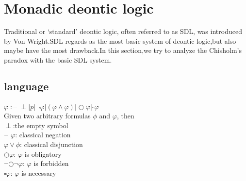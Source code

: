 \documentclass{article}
\begin{document}
\section{Monadic deontic logic}
Traditional or ‘standard’ deontic logic, often referred to as SDL, was introduced by Von Wright\cite{4}.SDL regards as the most basic system of deontic logic,but also maybe have the most drawback.In this section,we try to analyze the Chisholm’s paradox with the basic SDL system.
\subsection{language}
$\varphi :=\perp | p |\neg \varphi |(\varphi \wedge \varphi)|\bigcirc\varphi|\square\varphi $\\
Given two arbitrary formulas $\phi$  and $\varphi$, then\\
$\perp$:the empty symbol\\
$\neg$ $\varphi$: classical negation\\
$\varphi \vee  \phi $: classical disjunction\\
$\bigcirc \varphi $: $\varphi$ is obligatory\\
$ \neg \bigcirc\neg\varphi$: $ \varphi$ is forbidden\\
$ \square\varphi$: $\varphi$ is necessary
\end{document}
